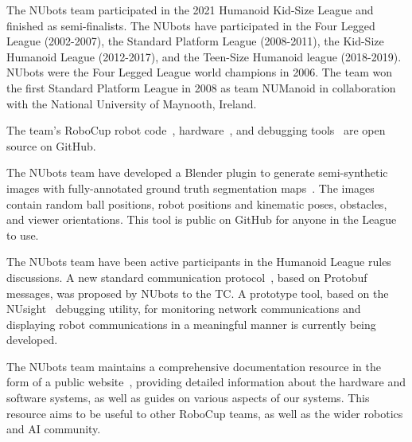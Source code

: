 \documentclass{llncs}
\begin{document}

The NUbots team participated in the 2021 Humanoid Kid-Size League and finished as semi-finalists. The NUbots have participated in the Four Legged League (2002-2007), the Standard Platform League (2008-2011), the Kid-Size Humanoid League (2012-2017), and the Teen-Size Humanoid league (2018-2019). NUbots were the Four Legged League world champions in 2006. The team won the first Standard Platform League in 2008 as team NUManoid in collaboration with the National University of Maynooth, Ireland.

The team's RoboCup robot code~\cite{nubotsGit}, hardware~\cite{nubotsHardwareGit}, and debugging tools~\cite{nubotsNUsightGit} are open source on GitHub. 

The NUbots team have developed a Blender plugin to generate semi-synthetic images with fully-annotated ground truth segmentation maps~\cite{nubotsNUpbrGit}. The images contain random ball positions, robot positions and kinematic poses, obstacles, and viewer orientations. This tool is public on GitHub for anyone in the League to use.

The NUbots team have been active participants in the Humanoid League rules discussions. A new standard communication protocol~\cite{nubotsProtocolGit}, based on Protobuf messages, was proposed by NUbots to the TC. A prototype tool, based on the NUsight~\cite{nubotsNUsightGit} debugging utility, for monitoring network communications and displaying robot communications in a meaningful manner is currently being developed.

The NUbots team maintains a comprehensive documentation resource in the form of a public website~\cite{nubotsNUbookGit}, providing detailed information about the hardware and software systems, as well as guides on various aspects of our systems. This resource aims to be useful to other RoboCup teams, as well as the wider robotics and AI community.





\end{document}

